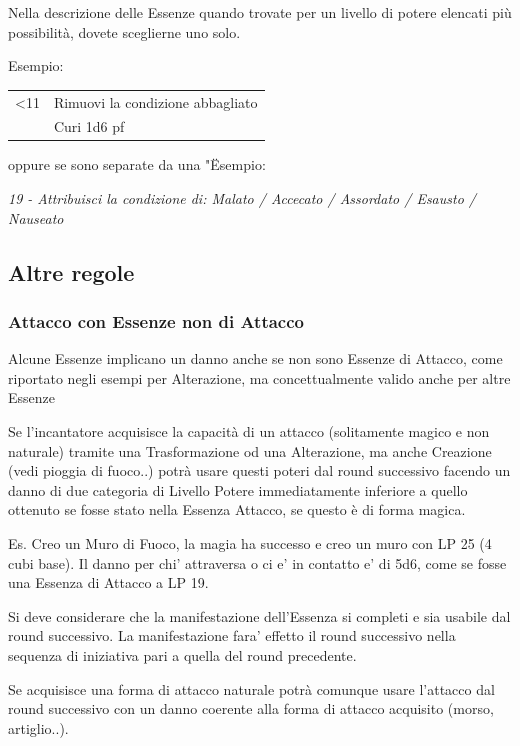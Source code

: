 \documentclass[a4paper,11pt,twoside,openany]{book}
\begin{document}
\label{scegliere-leffetto-dellessenza}

Nella descrizione delle Essenze quando trovate per un livello di potere elencati più possibilità, dovete sceglierne uno solo.

Esempio:

\medskip

\begin{tabularx}{0.95\textwidth}{lX}
	\toprule
	<11 & Rimuovi la condizione abbagliato\\
	    & Curi 1d6 pf
\end{tabularx}

oppure se sono separate da una "\" 
Esempio:

\textit{19 - Attribuisci la condizione di: Malato / Accecato / Assordato / Esausto / Nauseato}

\subsection{Altre regole}

\label{altre-regole}

\subsubsection{Attacco con Essenze non di Attacco}

Alcune Essenze implicano un danno anche se non sono Essenze di Attacco, come riportato negli esempi per Alterazione, ma concettualmente valido anche per altre Essenze

Se l'incantatore acquisisce la capacità di un attacco (solitamente magico e non naturale) tramite una Trasformazione od una Alterazione, ma anche Creazione (vedi pioggia di fuoco..) potrà usare questi poteri dal round successivo facendo un danno di due categoria di Livello Potere immediatamente inferiore a quello ottenuto se fosse stato nella Essenza Attacco, se questo è di forma magica.

Es. Creo un Muro di Fuoco, la magia ha successo e creo un muro con LP 25 (4 cubi base). Il danno per chi' attraversa o ci e' in contatto e' di 5d6, come se fosse una Essenza di Attacco a LP 19.

Si deve considerare che la manifestazione dell'Essenza si completi e sia usabile dal round successivo. La manifestazione fara' effetto il round successivo nella sequenza di iniziativa pari a quella del round precedente.

Se acquisisce una forma di attacco naturale potrà comunque usare l'attacco dal round successivo con un danno coerente alla forma di attacco acquisito (morso, artiglio..).
\end{document}
